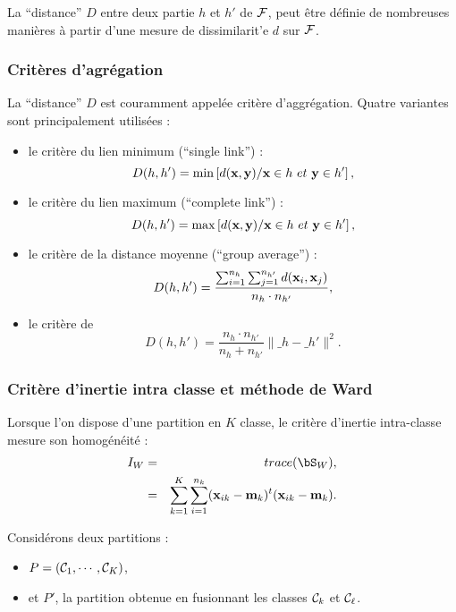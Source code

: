 La ``distance'' $D$ entre deux partie $h$ et $h'$ de ${\cal F}$, peut
\^etre d\'efinie de nombreuses mani\`eres \`a partir d'une
mesure de dissimilarit'e $d$ sur ${\cal F}$.
 

\subsubsection{Crit\`eres d'agr\'egation}

La ``distance'' $D$ est couramment appel\'ee crit\`ere d'aggr\'egation.
Quatre variantes sont principalement utilis\'ees :
\begin{itemize}
\item
le crit\`ere du lien minimum (``single link'')  :
$$
D(h,h')= \min \left [     d(\x , \y) / \x \in h \ et \ \y \in h' \right ],
$$
\item
le crit\`ere du lien maximum (``complete link'')  :
$$
D(h,h')= \max \left [     d(\x , \y) / \x \in h \ et \ \y \in h' \right ],
$$
\item
le crit\`ere de la distance moyenne (``group average'')  :
$$
D(h,h')= \frac{\sum_{i=1}^{n_{h}}  \sum_{j=1}^{n_{h'}}  d(\mbox{\bf x}_i , \mbox{\bf x}_j)}{n_{h} \cdot n_{h'}}, 
$$
\item
le crit\`ere de 
$$
D(h,h')= \frac{n_{h} \cdot n_{h'}}{n_{h} + n_{h'}}\|\bm_{h} - \bm_{h'} \|^2.
$$
\end{itemize}

\subsubsection{Crit\`ere d'inertie intra classe et m\'ethode de Ward}

Lorsque l'on dispose d'une partition en $K$ classe, le crit\`ere
d'inertie intra-classe mesure son homog\'en\'eit\'e :
\begin{eqnarray*}
I_W  & = & trace(\bS_W),\\
     & = & \sum_{k=1}^K \sum_{i=1}^{n_k} (\x_{ik} - \bm_k )^t (\x_{ik} - \bm_k).
\end{eqnarray*} 

Consid\'erons deux partitions :
\begin{itemize}
\item $P=\left ( {\cal C}_1, \cdots , {\cal C}_K  \right)$,

\item et $P'$, la partition obtenue en fusionnant les classes 
${\cal C}_k$ et ${\cal C}_{\ell}$. 
\end{itemize}

